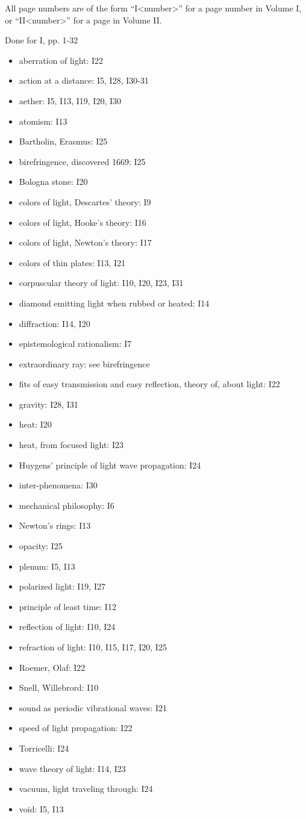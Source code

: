 \documentclass[a4paper]{article}
\theoremstyle{plain}
\theoremstyle{definition}
\begin{document}
All page numbers are of the form ``I<number>'' for a page number in
Volume I, or ``II<number>'' for a page in Volume II.

Done for I, pp. 1-32

\begin{itemize}
\item aberration of light: I22
\item action at a distance: I5, I28, I30-31
\item aether: I5, I13, I19, I20, I30
\item atomism: I13
\item Bartholin, Erasmus: I25
\item birefringence, discovered 1669: I25
\item Bologna stone: I20
\item colors of light, Descartes' theory: I9
\item colors of light, Hooke's theory: I16
\item colors of light, Newton's theory: I17
\item colors of thin plates: I13, I21
\item corpuscular theory of light: I10, I20, I23, I31
\item diamond emitting light when rubbed or heated: I14
\item diffraction: I14, I20
\item epistemological rationalism: I7
\item extraordinary ray: see birefringence
\item fits of easy transmission and easy reflection, theory of, about light: I22
\item gravity: I28, I31
\item heat: I20
\item heat, from focused light: I23
\item Huygens' principle of light wave propagation: I24
\item inter-phenomena: I30
\item mechanical philosophy: I6
\item Newton's rings: I13
\item opacity: I25
\item plenum: I5, I13
\item polarized light: I19, I27
\item principle of least time: I12
\item reflection of light: I10, I24
\item refraction of light: I10, I15, I17, I20, I25
\item Roemer, Olaf: I22
\item Snell, Willebrord: I10
\item sound as periodic vibrational waves: I21
\item speed of light propagation: I22
\item Torricelli: I24
\item wave theory of light: I14, I23
\item vacuum, light traveling through: I24
\item void: I5, I13
\end{itemize}






	
\end{document}
